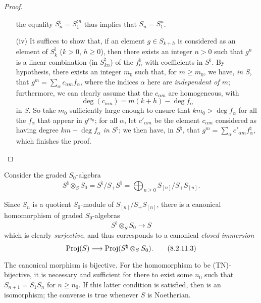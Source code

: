 \begin{proof}
\begin{enumerate}
    the equality $S_n^\natural=S_1^{\natural n}$ thus implies that $S_n=S_1^n$.
  \item[\rm{(iv)}] It suffices to show that, if an element $g\in S_{k+h}$ is considered as an element of $S_k^\natural$ ($k>0$, $h\geq0$), then there exists an integer $n>0$ such that $g^n$ is a linear combination (in $S_{kn}^\natural$) of the $f_\alpha^\natural$ with coefficients in $S^\natural$.
    By hypothesis, there exists an integer $m_0$ such that, for $m\geq m_0$, we have, \emph{in $S$}, that $g^m = \sum_\alpha c_{\alpha m}f_\alpha$, where the indices $\alpha$ here are \emph{independent of $m$};
    furthermore, we can clearly assume that the $c_{\alpha m}$ are homogeneous, with
    \[
      \deg(c_{\alpha m}) = m(k+h)-\deg f_\alpha
    \]
    in $S$.
    So take $m_0$ sufficiently large enough to ensure that $km_0>\deg f_\alpha$ for all the $f_\alpha$ that appear in $g^{m_0}$;
    for all $\alpha$, let $c'_{\alpha m}$ be the element $c_{\alpha m}$ considered as having degree $km-\deg f_\alpha$ \emph{in $S^\natural$};
    we then have, in $S^\natural$, that $g^m = \sum_\alpha c'_{\alpha m}f_\alpha^\natural$, which finishes the proof.
\end{enumerate}
\end{proof}

\begin{env}[8.2.11]
\label{II.8.2.11}
Consider the graded $S_0$-algebra
\[
\label{II.8.2.11.1}
  S^\natural \otimes_S S_0
  =
  S^\natural/S_+S^\natural
  =
  \bigoplus_{n\geq0} S_{[n]}/S_+S_{[n]}.
\tag{8.2.11.1}
\]

Since $S_n$ is a quotient $S_0$-module of $S_{[n]}/S_+S_{[n]}$, there is a canonical homomorphism of graded $S_0$-algebras
\[
\label{II.8.2.11.2}
  S^\natural \otimes_S S_0 \to S
\tag{8.2.11.2}
\]
which is clearly \emph{surjective}, and thus corresponds  to a canonical \emph{closed immersion}
\[
\label{II.8.2.11.3}
  \Proj(S) \to \Proj(S^\natural \otimes_S S_0).
\tag{8.2.11.3}
\]
\end{env}

\begin{proposition}[8.2.12]
\label{II.8.2.12}
The canonical morphism  is bijective.
For the homomorphism  to be (TN)-bijective, it is necessary and sufficient for there to exist some $n_0$ such that $S_{n+1}=S_1S_n$ for $n\geq n_0$.
If this latter condition is satisfied, then  is an isomorphism;
the converse is true whenever $S$ is Noetherian.
\end{proposition}

